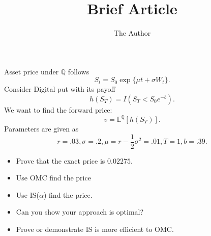 \documentclass[11pt]{amsart}
\title{Brief Article}
\author{The Author}
\begin{document}


\noindent Asset price under $\mathbb Q$ follows
 $$S_{t} = S_{0} \exp\{\mu t +\sigma W_{t}\}.$$
 Consider Digital put with its payoff
 $$h(S_{T}) = I(S_{T} < S_{0} e^{-b}).$$
 We want to find the forward price:
 $$v = \mathbb E^{\mathbb Q}[ h(S_{T})].$$
Parameters are given as
 $$r = .03, \sigma = .2, \mu = r- \frac 1 2 \sigma^{2} = .01, T = 1, b = .39.$$

 
\begin{itemize}
 \item Prove that the exact price is $0.02275$.
 \item Use OMC find the price
 \item Use IS($\alpha$) find the price. 
 \item Can you show your approach is optimal?
 \item Prove or demonstrate IS is more efficient to OMC.
\end{itemize}
\end{document}
